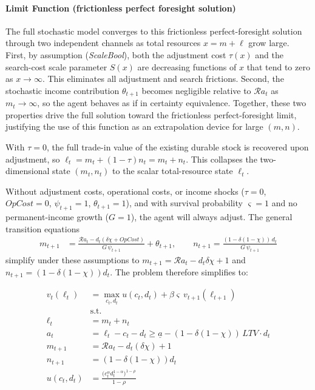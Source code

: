 \documentclass[\econtexMain]{subfiles}
\begin{document}
\paragraph{Limit Function (frictionless perfect foresight solution)}

The full stochastic model converges to this frictionless perfect-foresight solution through two independent channels as total resources $x = m + \ell$ grow large. First, by assumption (\textit{ScaleBool}), both the adjustment cost $\tau(x)$ and the search-cost scale parameter $S(x)$ are decreasing functions of $x$ that tend to zero as $x \to \infty$. This eliminates all adjustment and search frictions. Second, the stochastic income contribution $\theta_{t+1}$ becomes negligible relative to $\mathcal{R}a_t$ as $m_t \to \infty$, so the agent behaves as if in certainty equivalence. Together, these two properties drive the full solution toward the frictionless perfect-foresight limit, justifying the use of this function as an extrapolation device for large $(m,n)$.

With $\tau = 0$, the full trade-in value of the existing durable stock is recovered upon adjustment, so $\ell_t = m_t + (1-\tau)n_t = m_t + n_t$. This collapses the two-dimensional state $(m_t, n_t)$ to the scalar total-resource state $\ell_t$.

Without adjustment costs, operational costs, or income shocks ($\tau = 0$, $\textit{OpCost} = 0$, $\psi_{t+1} = 1$, $\theta_{t+1} = 1$), and with survival probability $\varsigma = 1$ and no permanent-income growth ($G = 1$), the agent will always adjust. The general transition equations
\begin{align}
	m_{t+1} &= \frac{\mathcal{R}a_t - d_t(\delta\chi + \textit{OpCost})}{G\,\psi_{t+1}} + \theta_{t+1}, \qquad
	n_{t+1} = \frac{(1-\delta(1-\chi))\,d_t}{G\,\psi_{t+1}}
\end{align}
simplify under these assumptions to $m_{t+1} = \mathcal{R}a_t - d_t\delta\chi + 1$ and $n_{t+1} = (1-\delta(1-\chi))d_t$. The problem therefore simplifies to:

\begin{align}
	v_t(\ell_t) &= \max_{c_t,d_t} u(c_t,d_t) + \beta\varsigma\, v_{t+1}(\ell_{t+1})\\
	& \text{s.t.} \nonumber \\
	\ell_t &= m_t + n_t \\
	a_t &= \ell_t - c_t - d_t \geq \underline{a} - (1-\delta(1-\chi))\, LTV \cdot d_t \\
	m_{t+1} &= \mathcal{R}a_t - d_t (\delta \chi) + 1\\
	n_{t+1} &= (1-\delta(1 - \chi))d_t\\
	u(c_t, d_t) &= \frac{\big(c_t^\alpha d_t^{1-\alpha}\big)^{1-\rho}}{1-\rho}
\end{align}
\end{document}
